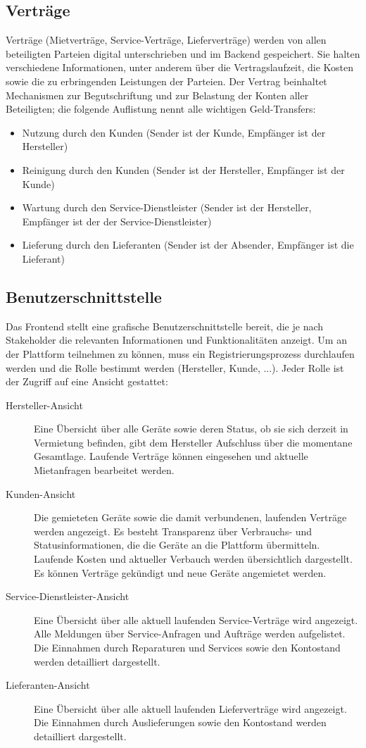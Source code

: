 \subsection{Verträge}
\label{subsec:iot_usecase:solution:contracts}
Verträge (Mietverträge, Service-Verträge, Lieferverträge) werden von allen beteiligten Parteien digital unterschrieben und im Backend gespeichert. Sie halten verschiedene Informationen, unter anderem über die Vertragslaufzeit, die Kosten sowie die zu erbringenden Leistungen der Parteien. Der Vertrag beinhaltet Mechanismen zur Begutschriftung und zur Belastung der Konten aller Beteiligten; die folgende Auflistung nennt alle wichtigen Geld-Transfers:
\begin{itemize}
  \item Nutzung durch den Kunden (Sender ist der Kunde, Empfänger ist der Hersteller)
  \item Reinigung durch den Kunden (Sender ist der Hersteller, Empfänger ist der Kunde)
  \item Wartung durch den Service-Dienstleister (Sender ist der Hersteller, Empfänger ist der der Service-Dienstleister)
  \item Lieferung durch den Lieferanten (Sender ist der Absender, Empfänger ist die Lieferant)
\end{itemize}

\subsection{Benutzerschnittstelle}
\label{subsec:iot_usecase:solution:frontend}
Das Frontend stellt eine grafische Benutzerschnittstelle bereit, die je nach Stakeholder die relevanten Informationen und Funktionalitäten anzeigt. Um an der Plattform teilnehmen zu können, muss ein Registrierungsprozess durchlaufen werden und die Rolle bestimmt werden (Hersteller, Kunde, ...). Jeder Rolle ist der Zugriff auf eine Ansicht gestattet:
\begin{description}
  \item[Hersteller-Ansicht] Eine Übersicht über alle Geräte sowie deren Status, ob sie sich derzeit in Vermietung befinden, gibt dem Hersteller Aufschluss über die momentane Gesamtlage. Laufende Verträge können eingesehen und aktuelle Mietanfragen bearbeitet werden.
  \item[Kunden-Ansicht] Die gemieteten Geräte sowie die damit verbundenen, laufenden Verträge werden angezeigt. Es besteht Transparenz über Verbrauchs- und Statusinformationen, die die Geräte an die Plattform übermitteln. Laufende Kosten und aktueller Verbauch werden übersichtlich dargestellt. Es können Verträge gekündigt und neue Geräte angemietet werden.
  \item[Service-Dienstleister-Ansicht] Eine Übersicht über alle aktuell laufenden Service-Verträge wird angezeigt. Alle Meldungen über Service-Anfragen und Aufträge werden aufgelistet. Die Einnahmen durch Reparaturen und Services sowie den Kontostand werden detailliert dargestellt.
  \item[Lieferanten-Ansicht] Eine Übersicht über alle aktuell laufenden Lieferverträge wird angezeigt. Die Einnahmen durch Auslieferungen sowie den Kontostand werden detailliert dargestellt.
\end{description}

